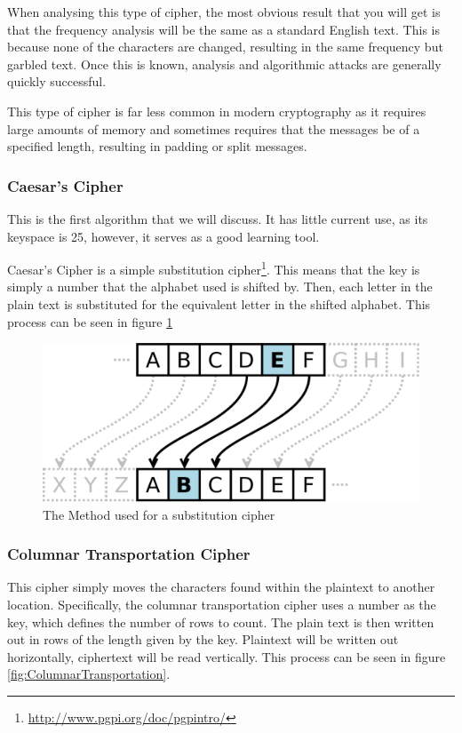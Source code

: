 				When analysing this type of cipher, the most obvious result that you will get is that the frequency analysis will be the same as a standard English text. 
				This is because none of the characters are changed, resulting in the same frequency but garbled text. 
				Once this is known, analysis and algorithmic attacks are generally quickly successful. 

				This type of cipher is far less common in modern cryptography as it requires large amounts of memory
				and sometimes requires that the messages be of a specified length, resulting in padding or split messages. 
			\subsubsection{Caesar's Cipher}
				This is the first algorithm that we will discuss. 
				It has little current use, as its keyspace is 25, however, it serves as a good learning tool. 

				Caesar's Cipher is a simple substitution cipher\footnote{\url{http://www.pgpi.org/doc/pgpintro/}}. 
				This means that the key is simply a number that the alphabet used is shifted by. 
				Then, each letter in the plain text is substituted for the equivalent letter in the shifted alphabet. 
				This process can be seen in figure \ref{fig:CaesarsCipher}
				\begin{figure}[htb]
					\centering
					\includegraphics[scale=0.25]{./CaesarsCipher.png}
					\caption{The Method used for a substitution cipher}
					\label{fig:CaesarsCipher}
				\end{figure}
			\subsubsection{Columnar Transportation Cipher}
				This cipher simply moves the characters found within the plaintext to another location. 
				Specifically, the columnar transportation cipher uses a number as the key, which defines the number of rows to count.
				The plain text is then written out in rows of the length given by the key. 
				Plaintext will be written out horizontally, ciphertext will be read vertically. 
				This process can be seen in figure \ref{fig:ColumnarTransportation}.

